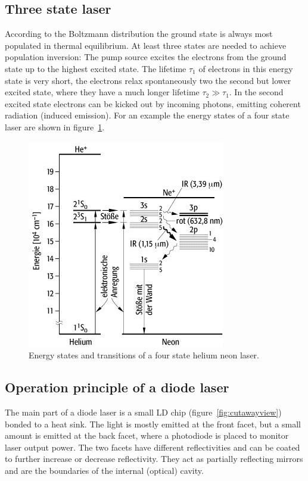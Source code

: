\subsection{Three state laser}\label{three-state-laser}

According to the Boltzmann distribution the ground state is always most populated in thermal
equilibrium.
At least three states are needed to achieve population inversion: The pump source excites the electrons from
the ground state up to the highest excited state.
The lifetime $\tau_1$ of electrons in this energy state is very short, the electrons relax
spontaneously two the second but lower excited state, where they have a much longer lifetime
$\tau_2 \gg \tau_1$.
In the second excited state electrons can be kicked out by incoming photons, emitting coherent
radiation (induced emission).
For an example the energy states of a four state laser are shown in
figure~\ref{fig:four_state_laser}.
\begin{figure}[ht]
  \centering
  \includegraphics[width=0.6\linewidth]{content/uebergaenge.jpg}
  \caption{Energy states and transitions of a four state helium neon laser\cite{anleitung_hene}.}%
  \label{fig:four_state_laser}
\end{figure}

\subsection{Operation principle of a diode laser}\label{sub:diode-laser}
The main part of a diode laser is a small LD chip (figure~\ref{fig:cutawayview}) bonded to a heat sink.
The light is mostly emitted at the front facet, but a small amount is emitted at the back facet,
where a photodiode is placed to monitor laser output power.
The two facets have different reflectivities and can be coated to further increase or decrease
reflectivity.
They act as partially reflecting mirrors and are the boundaries of the internal (optical) cavity.

